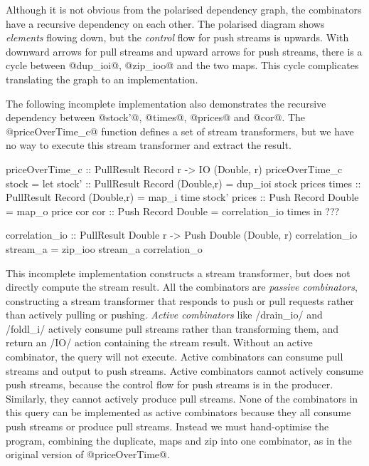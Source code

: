 Although it is not obvious from the polarised dependency graph, the combinators have a recursive dependency on each other.
The polarised diagram shows \emph{elements} flowing down, but the \emph{control} flow for push streams is upwards.
With downward arrows for pull streams and upward arrows for push streams, there is a cycle between @dup_ioi@, @zip_ioo@ and the two maps.
This cycle complicates translating the graph to an implementation.

The following incomplete implementation also demonstrates the recursive dependency between @stock'@, @times@, @prices@ and @cor@.
The @priceOverTime_c@ function defines a set of stream transformers, but we have no way to execute this stream transformer and extract the result.

\begin{haskell}
priceOverTime_c :: PullResult Record r -> IO (Double, r)
priceOverTime_c stock =
  let stock' :: PullResult Record (Double,r)
              = dup_ioi stock prices
      times  :: PullResult Record (Double,r)
              = map_i time stock'
      prices :: Push Record Double
              = map_o price cor
      cor    :: Push Record Double
              = correlation_io times
  in ???

correlation_io :: PullResult Double r -> Push Double (Double, r)
correlation_io stream_a = zip_ioo stream_a correlation_o
\end{haskell}

This incomplete implementation constructs a stream transformer, but does not directly compute the stream result.
All the combinators are \emph{passive combinators}, constructing a stream transformer that responds to push or pull requests rather than actively pulling or pushing.
\emph{Active combinators} like \Hs/drain_io/ and \Hs/foldl_i/ actively consume pull streams rather than transforming them, and return an \Hs/IO/ action containing the stream result.
Without an active combinator, the query will not execute.
Active combinators can consume pull streams and output to push streams.
Active combinators cannot actively consume push streams, because the control flow for push streams is in the producer.
Similarly, they cannot actively produce pull streams.
None of the combinators in this query can be implemented as active combinators because they all consume push streams or produce pull streams.
Instead we must hand-optimise the program, combining the duplicate, maps and zip into one combinator, as in the original version of @priceOverTime@.


